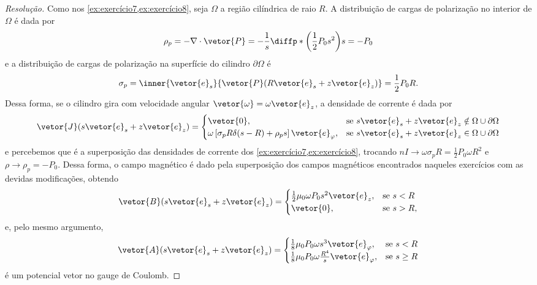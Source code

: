 \begin{proof}[Resolução]
    Como nos \cref{ex:exercício7,ex:exercício8}, seja \(\Omega\) a região cilíndrica de raio \(R\). A distribuição de cargas de polarização no interior de \(\Omega\) é dada por
    \begin{equation*}
        \rho_p = - \nabla \cdot \vetor{P} = - \frac1s \diffp*{\left(\frac12 P_0 s^2\right)}{s} = - P_0
    \end{equation*}
    e a distribuição de cargas de polarização na superfície do cilindro \(\partial \Omega\) é
    \begin{equation*}
        \sigma_p = \inner{\vetor{e}_s}{\vetor{P}(R\vetor{e}_s + z\vetor{e}_z)} = \frac12 P_0 R.
    \end{equation*}
    Dessa forma, se o cilindro gira com velocidade angular \(\vetor{\omega} = \omega \vetor{e}_z\), a densidade de corrente é dada por
    \begin{equation*}
        \vetor{J}(s \vetor{e}_s + z\vetor{e}_z) = \begin{cases}
            \vetor{0},&\text{se }s\vetor{e}_s + z\vetor{e}_z \notin \Omega \cup \partial \Omega\\
            \omega\left[\sigma_p R\delta(s - R) +\rho_p s\right]\vetor{e}_\varphi,&\text{se }s\vetor{e}_s + z\vetor{e}_z \in \Omega \cup \partial \Omega
        \end{cases}
    \end{equation*}
    e percebemos que é a superposição das densidades de corrente dos \cref{ex:exercício7,ex:exercício8}, trocando \(nI \to \omega\sigma_pR = \frac12 P_0 \omega R^2\) e \(\rho \to \rho_p = -P_0\). Dessa forma, o campo magnético é dado pela superposição dos campos magnéticos encontrados naqueles exercícios com as devidas modificações, obtendo
    \begin{equation*}
        \vetor{B}(s\vetor{e}_s + z\vetor{e}_z) = \begin{cases}
            \frac12 \mu_0 \omega P_0 s^2\vetor{e}_z,&\text{se }s < R\\
            \vetor{0},&\text{se }s > R,
        \end{cases}
    \end{equation*}
    e, pelo mesmo argumento,
    \begin{equation*}
        \vetor{A}(s\vetor{e}_s + z\vetor{e}_z) = \begin{cases}
            \frac18 \mu_0 P_0 \omega s^3 \vetor{e}_\varphi,&\text{se }s < R\\
            \frac18 \mu_0 P_0 \omega\frac{R^4}{s}\vetor{e}_\varphi,&\text{se }s \geq R
        \end{cases}
    \end{equation*}
    é um potencial vetor no gauge de Coulomb.
\end{proof}
